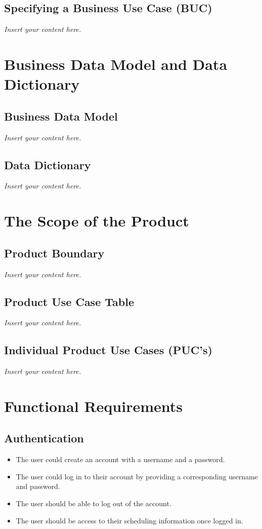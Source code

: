 \documentclass[12pt]{article}
\newcommand{\lips}{\textit{Insert your content here.}}
\newcounter{reqnum} %
\newcommand{\rthereqnum}{FR\refstepcounter{reqnum}\thereqnum:}
\begin{document}
\subsection{Specifying a Business Use Case (BUC)}
\lips

\section{Business Data Model and Data Dictionary}
\subsection{Business Data Model}
\lips
\subsection{Data Dictionary}
\lips

\section{The Scope of the Product}
\subsection{Product Boundary}
\lips
\subsection{Product Use Case Table}
\lips
\subsection{Individual Product Use Cases (PUC's)}
\lips

\section{Functional Requirements}
\subsection{Authentication}
\begin{itemize}

\item[\rthereqnum \label{R_GetConsent}]
The user could create an account with a username and a password.
\item[\rthereqnum \label{R_GetConsent}]
The user could log in to their account by providing a corresponding username and password.
\item[\rthereqnum \label{R_GetConsent}]
The user should be able to log out of the account.
\item[\rthereqnum \label{R_GetConsent}]
The user should be access to their scheduling information once logged in.

\end{itemize}
\end{document}
